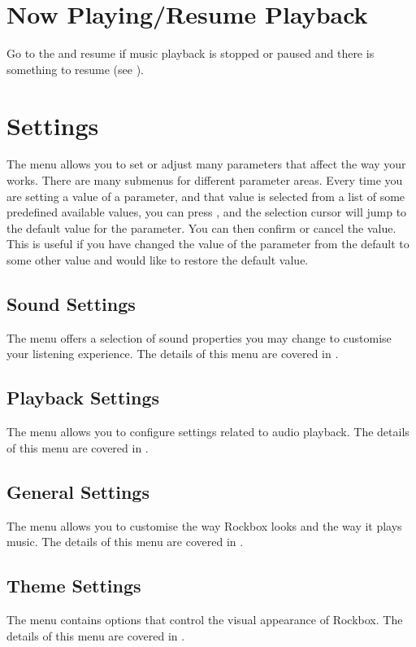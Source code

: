 \section{Now Playing/Resume Playback}
Go to the  and resume if music playback is
stopped or paused and there is something to resume (see ).

\section{Settings}

The  menu allows you to set or adjust many parameters that
affect the way your \dap{} works. There are many submenus for different
parameter areas. Every time you are setting a value of a parameter, and that
value is selected from a list of some predefined available values, you can press
\ActionStdContext, and the selection cursor will jump to the default value for
the parameter. You can then confirm or cancel the value. This is useful if you
have changed the value of the parameter from the default to some other value and
would like to restore the default value.

\subsection{Sound Settings}
The  menu offers a selection of sound properties you may 
change to customise your listening experience. The details of this menu are covered
in .

\subsection{Playback Settings}
The  menu allows you to configure settings related
to audio playback. The details of this menu are covered
in .

\subsection{General Settings}
The  menu allows you to customise the way Rockbox looks 
and the way it plays music. The details of this menu are covered in
.

\subsection{Theme Settings}
The  menu contains options that control the visual
appearance of Rockbox. The details of this menu are covered in
.

